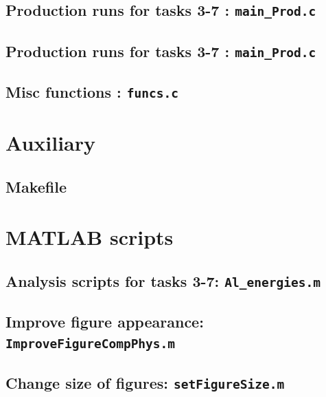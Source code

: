 \subsection{Production runs for tasks 3-7 : \texttt{main\_Prod.c}}


\subsection{Production runs for tasks 3-7 : \texttt{main\_Prod.c}}



\subsection{Misc functions : \texttt{funcs.c}}


\section{Auxiliary }
\subsection{Makefile}




\section{MATLAB scripts}
\subsection{Analysis scripts for tasks 3-7: \texttt{Al\_energies.m}}


\subsection{Improve figure appearance: \texttt{ImproveFigureCompPhys.m}}


\subsection{Change size of figures: \texttt{setFigureSize.m}}



